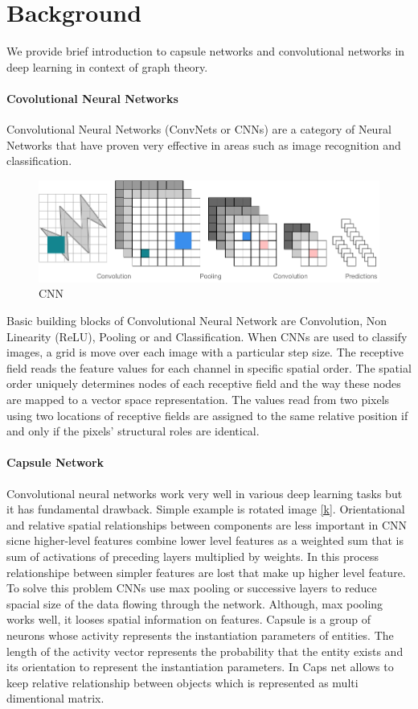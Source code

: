 \section{Background}
We provide brief introduction to capsule networks and convolutional networks in deep learning in context of graph theory.

\paragraph{Covolutional Neural Networks}
Convolutional Neural Networks (ConvNets or CNNs) are a category of Neural Networks that have proven very effective in areas such as image recognition and classification.
\begin{figure}[!htbp]
  \centering
  \includegraphics[width=\linewidth,height=\textheight,keepaspectratio]{images/CNN.png}
  \caption{CNN}
  \label{cnn}
\end{figure}
\FloatBarrier
Basic building blocks of Convolutional Neural Network are Convolution, Non Linearity (ReLU), Pooling or and Classification. When CNNs are used to classify images, a grid is move over each image with a particular step size. The receptive field reads the feature values for each channel in specific spatial order. The spatial order uniquely determines nodes of each receptive field and the way these nodes are mapped to a vector space representation. The values read from two pixels using two locations of receptive fields are assigned to the same relative position if and only if the pixels' structural roles are identical.

\paragraph{Capsule Network}
Convolutional neural networks work very well in various deep learning tasks but it has fundamental drawback. Simple example is rotated image \ref{k}. Orientational and relative spatial relationships between components are less important in CNN sicne higher-level features combine lower level features as a weighted sum that is sum of activations of preceding layers multiplied by weights. In this process relationshipe between simpler features are lost that make up higher level feature. To solve this problem CNNs use max pooling or successive layers to reduce spacial size of the data flowing through the network. Although, max pooling works well, it looses spatial information on features.
Capsule is a group of neurons whose activity represents the instantiation parameters of entities. The length of the activity vector represents the probability that the entity exists and its orientation to represent the instantiation parameters. In Caps net allows to keep relative relationship between objects which is represented as multi dimentional matrix.

